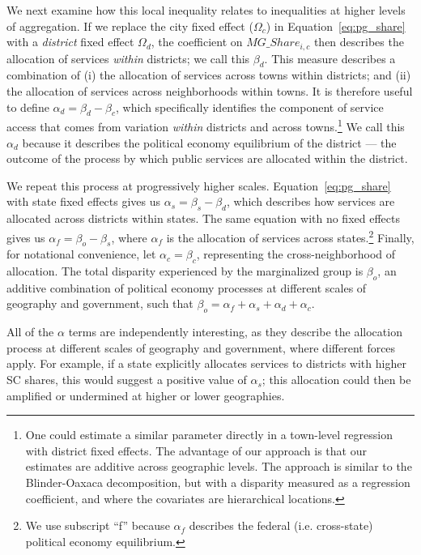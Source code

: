 \documentclass[12pt]{article}
\begin{document}
We next examine how this local inequality relates to inequalities at higher levels of aggregation. If we replace the city fixed effect ($\Omega_c$) in Equation~\ref{eq:pg_share} with a \textit{district} fixed effect $\Omega_d$, the coefficient on $MG\_Share_{i,c}$ then describes the allocation of services \textit{within} districts; we call this $\beta_d$. This measure describes a combination of (i) the allocation of services across towns within districts; and (ii) the allocation of services across neighborhoods within towns. It is therefore useful to define $\alpha_d = \beta_d - \beta_c$, which specifically identifies the component of service access that comes from variation \textit{within} districts and across towns.\footnote{One could estimate a similar parameter directly in a town-level regression with district fixed effects. The advantage of our approach is that our estimates are additive across geographic levels. The approach is similar to the Blinder-Oaxaca decomposition, but with a disparity measured as a regression coefficient, and where the covariates are hierarchical locations.} We call this $\alpha_d$ because it describes the political economy equilibrium of the district --- the outcome of the process by which public services are allocated within the district.

We repeat this process at progressively higher scales. Equation~\ref{eq:pg_share} with state fixed effects gives us $\alpha_s = \beta_s - \beta_d$, which describes how services are allocated across districts within states. The same equation with no fixed effects gives us $\alpha_f = \beta_o - \beta_s$, where $\alpha_f$ is the allocation of services across states.\footnote{We use subscript ``f'' because $\alpha_f$ describes the federal (i.e. cross-state) political economy equilibrium.} Finally, for notational convenience, let $\alpha_c=\beta_c$, representing the cross-neighborhood of allocation. The total disparity experienced by the marginalized group is $\beta_o$, an additive combination of political economy processes at different scales of geography and government, such that $\beta_o = \alpha_f + \alpha_s + \alpha_d + \alpha_c.$

All of the $\alpha$ terms are independently interesting, as they describe the allocation process at different scales of geography and government, where different forces apply. For example, if a state explicitly allocates services to districts with higher SC shares, this would suggest a positive value of $\alpha_s$; this allocation could then be amplified or undermined at higher or lower geographies.
\end{document}
